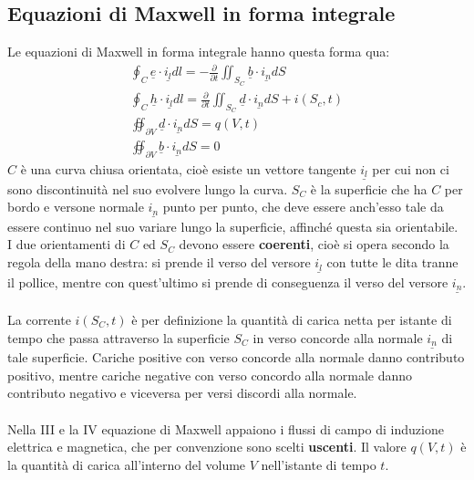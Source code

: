 \documentclass{book}
\begin{document}
        \subsection{Equazioni di Maxwell in forma integrale}
            Le equazioni di Maxwell in forma integrale hanno questa forma qua:
            \begin{align}
                \oint_{C} \underline{e} \cdot \underline{i_{l}} dl = - \frac{\partial}{\partial t}\iint_{S_{C}} \underline{b} \cdot \underline{i_{n}} dS \quad \\
                \oint_{C} \underline{h} \cdot \underline{i_{l}} dl = \frac{\partial}{\partial t} \iint_{S_{C}} \underline{d} \cdot \underline{i_{n}} dS + i(S_{c},t) \\
                \oiint_{\partial V} \underline{d} \cdot \underline{i_{n}} dS = q(V,t) \\
                \oiint_{\partial V} \underline{b} \cdot \underline{i_{n}}dS = 0
            \end{align}
        $C$ è una curva chiusa orientata, cioè esiste un vettore tangente $\underline{i_{l}}$ per cui non ci sono discontinuità nel suo evolvere lungo la curva. $S_{C}$ è la superficie che ha $C$ per bordo e versone normale $\underline{i_{n}}$ punto per punto, che deve essere anch'esso tale da essere continuo nel suo variare lungo la superficie, affinché questa sia orientabile.\\
        I due orientamenti di $C$ ed $S_{C}$ devono essere \textbf{coerenti}, cioè si opera secondo la regola della mano destra: si prende il verso del versore $\underline{i_{l}}$ con tutte le dita tranne il pollice, mentre con quest'ultimo si prende di conseguenza il verso del versore $\underline{i_{n}}$. \\ \\
        La corrente $i(S_{C}, t)$ è per definizione la quantità di carica netta per istante di tempo che passa attraverso la superficie $S_{C}$ in verso concorde alla normale $\underline{i_{n}}$ di tale superficie. Cariche positive con verso concorde alla normale danno contributo positivo, mentre cariche negative con verso concordo alla normale danno contributo negativo e viceversa per versi discordi alla normale. \\ \\
        Nella III e la IV equazione di Maxwell appaiono i flussi di campo di induzione elettrica e magnetica, che per convenzione sono scelti \textbf{uscenti}. Il valore $q(V,t)$ è la quantità di carica all'interno del volume $V$ nell'istante di tempo $t$. \\ \\ 
\end{document}
